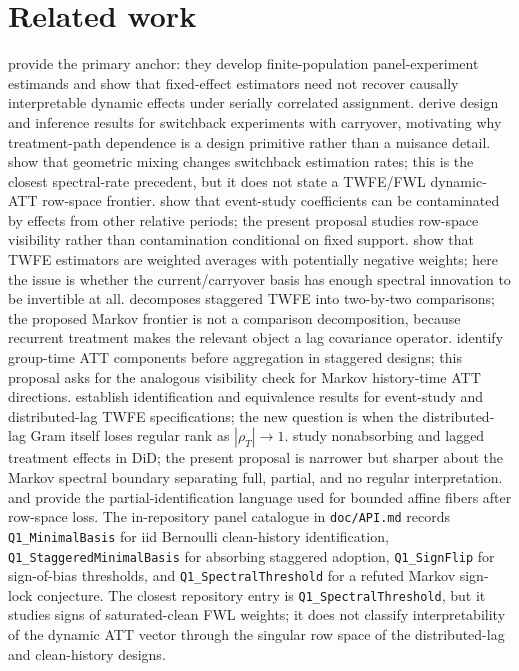 \documentclass[11pt]{article}
\theoremstyle{definition}
\theoremstyle{plain}
\theoremstyle{remark}
\begin{document}
\section{Related work}
\citet{bojinov2021panel} provide the primary anchor: they develop finite-population panel-experiment estimands and show that fixed-effect estimators need not recover causally interpretable dynamic effects under serially correlated assignment.
\citet{bojinov2023switchback} derive design and inference results for switchback experiments with carryover, motivating why treatment-path dependence is a design primitive rather than a nuisance detail.
\citet{hu2022switchback} show that geometric mixing changes switchback estimation rates; this is the closest spectral-rate precedent, but it does not state a TWFE/FWL dynamic-ATT row-space frontier.
\citet{sunabraham2021eventstudy} show that event-study coefficients can be contaminated by effects from other relative periods; the present proposal studies row-space visibility rather than contamination conditional on fixed support.
\citet{dechaisemartin2020twfe} show that TWFE estimators are weighted averages with potentially negative weights; here the issue is whether the current/carryover basis has enough spectral innovation to be invertible at all.
\citet{goodmanbacon2021timing} decomposes staggered TWFE into two-by-two comparisons; the proposed Markov frontier is not a comparison decomposition, because recurrent treatment makes the relevant object a lag covariance operator.
\citet{callaway2021multiple} identify group-time ATT components before aggregation in staggered designs; this proposal asks for the analogous visibility check for Markov history-time ATT directions.
\citet{schmidheiny2023event} establish identification and equivalence results for event-study and distributed-lag TWFE specifications; the new question is when the distributed-lag Gram itself loses regular rank as \(|\rho_T|\to1\).
\citet{dechaisemartin2024intertemporal} study nonabsorbing and lagged treatment effects in DiD; the present proposal is narrower but sharper about the Markov spectral boundary separating full, partial, and no regular interpretation.
\citet{manski2003partial} and \citet{tamer2010partial} provide the partial-identification language used for bounded affine fibers after row-space loss.
The in-repository panel catalogue in \texttt{doc/API.md} records \texttt{Q1\_MinimalBasis} for iid Bernoulli clean-history identification, \texttt{Q1\_StaggeredMinimalBasis} for absorbing staggered adoption, \texttt{Q1\_SignFlip} for sign-of-bias thresholds, and \texttt{Q1\_SpectralThreshold} for a refuted Markov sign-lock conjecture.
The closest repository entry is \texttt{Q1\_SpectralThreshold}, but it studies signs of saturated-clean FWL weights; it does not classify interpretability of the dynamic ATT vector through the singular row space of the distributed-lag and clean-history designs.
\end{document}
